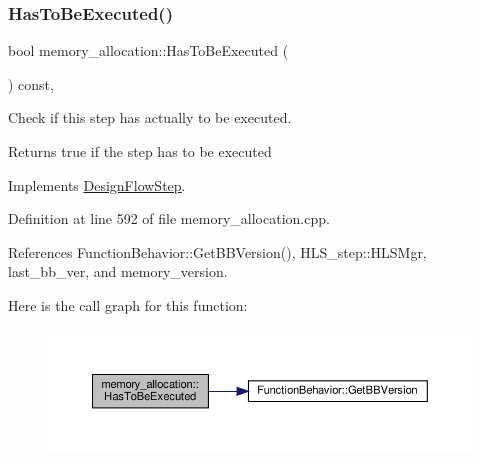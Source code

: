 \mbox{\label{classmemory__allocation_a933144a32a794f82719db7874abd3562}} 
\subsubsection{\texorpdfstring{Has\+To\+Be\+Executed()}{HasToBeExecuted()}}
{\footnotesize\ttfamily bool memory\+\_\+allocation\+::\+Has\+To\+Be\+Executed (\begin{DoxyParamCaption}{ }\end{DoxyParamCaption}) const\hspace{0.3cm}{\ttfamily [override]}, {\ttfamily [virtual]}}



Check if this step has actually to be executed. 

\begin{DoxyReturn}{Returns}
true if the step has to be executed 
\end{DoxyReturn}


Implements \hyperlink{classDesignFlowStep_a1783abe0c1d162a52da1e413d5d1ef05}{Design\+Flow\+Step}.



Definition at line 592 of file memory\+\_\+allocation.\+cpp.



References Function\+Behavior\+::\+Get\+B\+B\+Version(), H\+L\+S\+\_\+step\+::\+H\+L\+S\+Mgr, last\+\_\+bb\+\_\+ver, and memory\+\_\+version.

Here is the call graph for this function\+:
\nopagebreak
\begin{figure}[H]
\begin{center}
\leavevmode
\includegraphics[width=350pt]{db/d9f/classmemory__allocation_a933144a32a794f82719db7874abd3562_cgraph}
\end{center}
\end{figure}
\mbox{\label{classmemory__allocation_a7d2e79df1dbef9bc6682ca310eb408d5}} 
